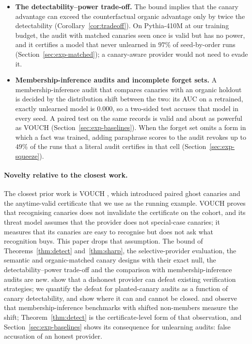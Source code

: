 \begin{itemize}
\item \textbf{The detectability--power trade-off.} The bound implies that the canary advantage
can exceed the counterfactual organic advantage only by twice the detectability
(Corollary~\ref{cor:tradeoff}). On Pythia-410M at our training budget, the audit with matched
canaries seen once is valid but has no power, and it certifies a model that never unlearned in
$97\%$ of seed-by-order runs (Section~\ref{sec:exp-matched}); a canary-aware provider would not
need to evade it.

\item \textbf{Membership-inference audits and incomplete forget sets.} A membership-inference
audit that compares canaries with an organic holdout is decided by the distribution shift
between the two: its AUC on a retrained, exactly unlearned model is $0.000$, so a two-sided
test accuses that model in every seed. A paired test on the same records is valid and about as
powerful as VOUCH (Section~\ref{sec:exp-baselines}). When the forget set omits a form in which a
fact was trained, adding paraphrase scores to the audit revokes up to $49\%$ of the runs that a
literal audit certifies in that cell (Section~\ref{sec:exp-squeeze}).
\end{itemize}

\paragraph{Novelty relative to the closest work.} The closest prior work is VOUCH
\citep{dang2026vouch}, which introduced paired ghost canaries and the anytime-valid
certificate that we use as the running example. VOUCH proves that recognising canaries does
not invalidate the certificate on the cohort, and its threat model assumes that the
provider does not special-case canaries; it measures that its canaries are easy to
recognise but does not ask what recognition buys. This paper drops that assumption. The
bound of Theorems~\ref{thm:detect} and~\ref{thm:sharp}, the selective-provider evaluation,
the semantic and organic-matched canary designs with their exact null, the
detectability--power trade-off and the comparison with membership-inference audits are new.
\citet{zhang2024verification} show that a dishonest provider can defeat existing
verification strategies; we quantify the defeat for planted-canary audits as a function of
canary detectability, and show where it can and cannot be closed.
\citet{duan2024membership} and \citet{das2024blind} observe that membership-inference
benchmarks with shifted non-members measure the shift; Theorem~\ref{thm:detect} is the
certificate-level form of that observation, and Section~\ref{sec:exp-baselines} shows its
consequence for unlearning audits: false accusation of an honest provider.

